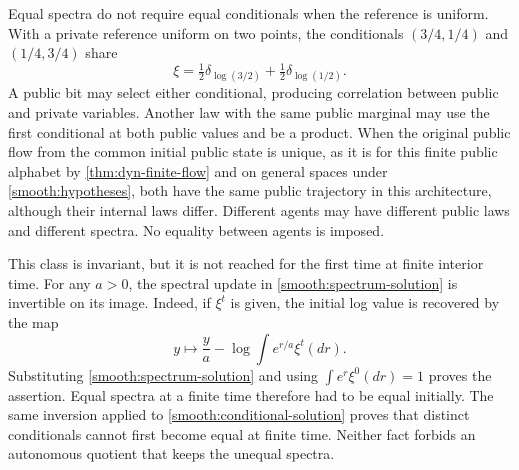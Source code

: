 Equal spectra do not require equal conditionals when the reference is uniform. With a private reference uniform on two points, the conditionals $(3/4,1/4)$ and $(1/4,3/4)$ share
\begin{equation}
 \xi=\tfrac12\delta_{\log(3/2)}+
      \tfrac12\delta_{\log(1/2)}.
 \label{smooth:swapped-spectrum}
\end{equation}
A public bit may select either conditional, producing correlation between public and private variables. Another law with the same public marginal may use the first conditional at both public values and be a product. When the original public flow from the common initial public state is unique, as it is for this finite public alphabet by \cref{thm:dyn-finite-flow} and on general spaces under \cref{smooth:hypotheses}, both have the same public trajectory in this architecture, although their internal laws differ. Different agents may have different public laws and different spectra. No equality between agents is imposed.

This class is invariant, but it is not reached for the first time at finite interior time. For any $a>0$, the spectral update in \cref{smooth:spectrum-solution} is invertible on its image. Indeed, if $\xi^t$ is given, the initial log value is recovered by the map
\begin{equation}
 y\longmapsto\frac{y}{a}
 -\log\int e^{r/a}\xi^t(dr).
 \label{smooth:spectrum-inverse}
\end{equation}
Substituting \cref{smooth:spectrum-solution} and using $\int e^r\xi^0(dr)=1$ proves the assertion. Equal spectra at a finite time therefore had to be equal initially. The same inversion applied to \cref{smooth:conditional-solution} proves that distinct conditionals cannot first become equal at finite time. Neither fact forbids an autonomous quotient that keeps the unequal spectra.

